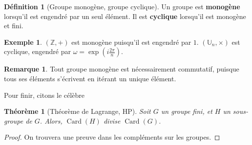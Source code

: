\documentclass[french]{book}
\newcommand{\Z}{\mathbb{Z}}
\newcommand{\U}{\mathbb{U}}
\theoremstyle{plain}
\newtheorem{thm}{Théorème}[chapter]
\theoremstyle{definition}
\newtheorem{dfn}{Définition}[chapter]
\newtheorem{exa}{Exemple}[chapter]
\newtheorem{rmq}{Remarque}[chapter]
\theoremstyle{remark}
\DeclareMathOperator{\card}{Card}
\begin{document}
\begin{dfn}[Groupe monogène, groupe cyclique]
	Un groupe est \textbf{monogène} lorsqu'il est engendré par un seul élément. Il est \textbf{cyclique} lorsqu'il est monogène et fini.
\end{dfn}
\begin{exa}
	$(\Z,+)$ est monogène puisqu'il est engendré par $1$. $(\U_n,\times)$ est cyclique, engendré par $\displaystyle\omega=\exp\left(i\frac{2\pi}{n}\right)$.
\end{exa}
\begin{rmq}
	Tout groupe monogène est nécessairement commutatif, puisque tous ses éléments s'écrivent en itérant un unique élément.
\end{rmq}
Pour finir, citons le célèbre
\begin{thm}[Théorème de Lagrange, HP]
	Soit $G$ un groupe fini, et $H$ un sous-groupe de $G$. Alors, $\card(H)$ divise $\card(G)$.
\end{thm}
\begin{proof}
	On trouvera une preuve dans les compléments sur les groupes.
\end{proof}
\end{document}
